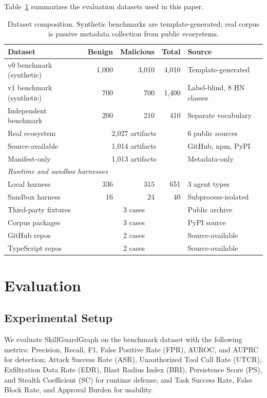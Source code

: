 \documentclass[10pt]{article}
\begin{document}
Table~\ref{tab:dataset} summarizes the evaluation datasets used in this paper.

\begin{table}[t]
\centering
\caption{Dataset composition. Synthetic benchmarks are template-generated; real corpus is passive metadata collection from public ecosystems.}
\label{tab:dataset}
\begin{tabular}{lrrrl}
\toprule
Dataset & Benign & Malicious & Total & Source \\
\midrule
v0 benchmark (synthetic) & 1{,}000 & 3{,}010 & 4{,}010 & Template-generated \\
v1 benchmark (synthetic) & 700 & 700 & 1{,}400 & Label-blind, 8 HN classes \\
Independent benchmark & 200 & 210 & 410 & Separate vocabulary \\
Real ecosystem & \multicolumn{3}{c}{2{,}027 artifacts} & 6 public sources \\
\quad Source-available & \multicolumn{3}{c}{1{,}014 artifacts} & GitHub, npm, PyPI \\
\quad Manifest-only & \multicolumn{3}{c}{1{,}013 artifacts} & Metadata-only \\
\midrule
\multicolumn{5}{l}{\textit{Runtime and sandbox harnesses}} \\
Local harness & 336 & 315 & 651 & 3 agent types \\
Sandbox harness & 16 & 24 & 40 & Subprocess-isolated \\
Third-party fixtures & \multicolumn{3}{c}{3 cases} & Public archive \\
Corpus packages & \multicolumn{3}{c}{3 cases} & PyPI source \\
GitHub repos & \multicolumn{3}{c}{2 cases} & Source-available \\
TypeScript repos & \multicolumn{3}{c}{2 cases} & Source-available \\
\bottomrule
\end{tabular}
\end{table}

\section{Evaluation}
\label{sec:eval}

\subsection{Experimental Setup}

We evaluate SkillGuardGraph on the benchmark dataset with the following metrics: Precision, Recall, F1, False Positive Rate (FPR), AUROC, and AUPRC for detection; Attack Success Rate (ASR), Unauthorized Tool Call Rate (UTCR), Exfiltration Data Rate (EDR), Blast Radius Index (BRI), Persistence Score (PS), and Stealth Coefficient (SC) for runtime defense; and Task Success Rate, False Block Rate, and Approval Burden for usability.
\end{document}
